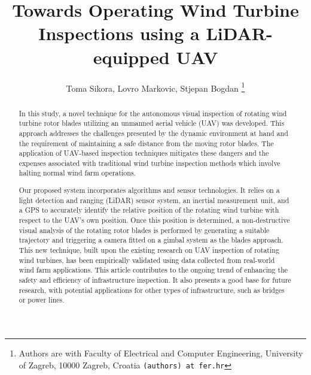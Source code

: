 \documentclass[letterpaper, 10 pt, conference]{ieeeconf}  %
\title{\LARGE \bf
 Towards Operating Wind Turbine Inspections using a LiDAR-equipped UAV
}
\author{Toma Sikora, Lovro Markovic, Stjepan Bogdan
	\thanks{Authors are with Faculty of Electrical and Computer Engineering,
        University of Zagreb, 10000 Zagreb, Croatia
        {\tt\small (authors) at fer.hr}}}%
\begin{document}
\maketitle

\thispagestyle{empty}
\pagestyle{empty}


\begin{abstract}
In this study, a novel technique for the autonomous visual inspection of rotating wind turbine rotor blades utilizing an unmanned aerial vehicle (UAV) was developed. This approach addresses the challenges presented by the dynamic environment at hand and the requirement of maintaining a safe distance from the moving rotor blades. The application of UAV-based inspection techniques mitigates these dangers and the expenses associated with traditional wind turbine inspection methods which involve halting normal wind farm operations.

Our proposed system incorporates algorithms and sensor technologies. It relies on a light detection and ranging (LiDAR) sensor system, an inertial measurement unit, and a GPS to accurately identify the relative position of the rotating wind turbine with respect to the UAV's own position. Once this position is determined, a non-destructive visual analysis of the rotating rotor blades is performed by generating a suitable trajectory and triggering a camera fitted on a gimbal system as the blades approach. This new technique, built upon the existing research on UAV inspection of rotating wind turbines, has been empirically validated using data collected from real-world wind farm applications.
This article contributes to the ongoing trend of enhancing the safety and efficiency of infrastructure inspection. It also presents a good base for future research, with potential applications for other types of infrastructure, such as bridges or power lines.
\end{abstract}
%
%
%
%
%
%






\end{document}
